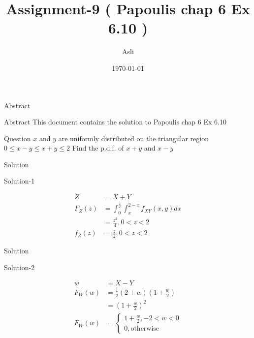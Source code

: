 \documentclass{beamer}
\title{ Assignment-9 ( Papoulis chap 6 Ex 6.10 )}
\author{Asli}
\institute{IIT Hyderabad}
\date{\today }
\providecommand{\brak}[1]{\ensuremath{\left(#1\right)}}
\begin{document}
\begin{frame}
      \titlepage
\end{frame}



\begin{frame}{Abstract}
      \begin{block}{Abstract}
          This document contains the solution to Papoulis chap 6 Ex 6.10
      \end{block}
\end{frame}



\begin{frame}
      \begin{block}{Question}
          $x$ and $y$ are uniformly distributed on the triangular region $0 \leq x - y \leq x + y \leq 2$ Find the p.d.f. of $x + y$ and $x - y$
      \end{block}
\end{frame}
     
     
     
\begin{frame}{Solution}
      \begin{block}{Solution-1}
          
            \begin{align}
                     Z &= X + Y    \\
              F_{Z}(z) &= \int_{0}^{\frac{z}{2}} \int_{x}^{2-x} f_{XY}(x,y)dx  \\
                       &= \frac{z^{2}}{4} , 0 < z < 2 \\
              f_{Z}(z) &= \frac{z}{2} , 0 < z < 2
            \end{align}
          
      \end{block}
\end{frame}



\begin{frame}{Solution}
      \begin{block}{Solution-2}
      
            \begin{align}
                    w &= X - Y \\
             F_{W}(w) &= \frac{1}{2}( 2 + w )( 1 + \frac{w}{2} ) \\
                      &= \brak{ 1 + \frac{w}{2} }^{2} \\
             F_{W}(w) &=   
                   \begin{cases}
                            1 + \frac{w}{2} , -2 < w < 0  \\
                            0 , \text{otherwise}
                   \end{cases}
            \end{align}
          
      \end{block}
    
\end{frame}


         
\end{document}
